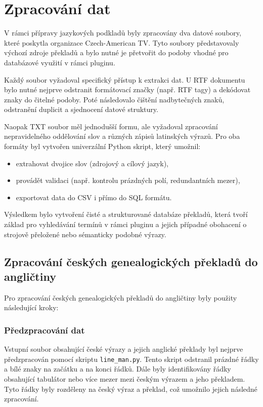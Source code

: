 \documentclass[czech, ba, kiv, he]{fasthesis}
\begin{document}
\section{Zpracování dat}

V rámci přípravy jazykových podkladů byly zpracovány dva datové soubory, které poskytla organizace Czech-American TV. Tyto soubory představovaly výchozí zdroje překladů a bylo nutné je přetvořit do podoby vhodné pro databázové využití v rámci pluginu.

Každý soubor vyžadoval specifický přístup k extrakci dat. U RTF dokumentu bylo nutné nejprve odstranit formátovací značky (např. RTF tagy) a dekódovat znaky do čitelné podoby. Poté následovalo čištění nadbytečných znaků, odstranění duplicit a sjednocení datové struktury.

Naopak TXT soubor měl jednodušší formu, ale vyžadoval zpracování nepravidelného oddělování slov a různých zápisů latinských výrazů. Pro oba formáty byl vytvořen univerzální Python skript, který umožnil:
\begin{itemize}
    \item extrahovat dvojice slov (zdrojový a cílový jazyk),
    \item provádět validaci (např. kontrolu prázdných polí, redundantních mezer),
    \item exportovat data do CSV i přímo do SQL formátu.
\end{itemize}

Výsledkem bylo vytvoření čisté a strukturované databáze překladů, která tvoří základ pro vyhledávání termínů v rámci pluginu a jejich případné obohacení o strojově přeložené nebo sémanticky podobné výrazy.


\subsection{Zpracování českých genealogických překladů do angličtiny}

Pro zpracování českých genealogických překladů do angličtiny byly použity následující kroky:

\subsubsection*{Předzpracování dat}

Vstupní soubor obsahující české výrazy a jejich anglické překlady byl nejprve předzpracován pomocí skriptu \texttt{line\_man.py}. Tento skript odstranil prázdné řádky a bílé znaky na začátku a na konci řádků. Dále byly identifikovány řádky obsahující tabulátor nebo více mezer mezi českým výrazem a jeho překladem. Tyto řádky byly rozděleny na český výraz a překlad, což umožnilo jejich následné zpracování.
\end{document}
